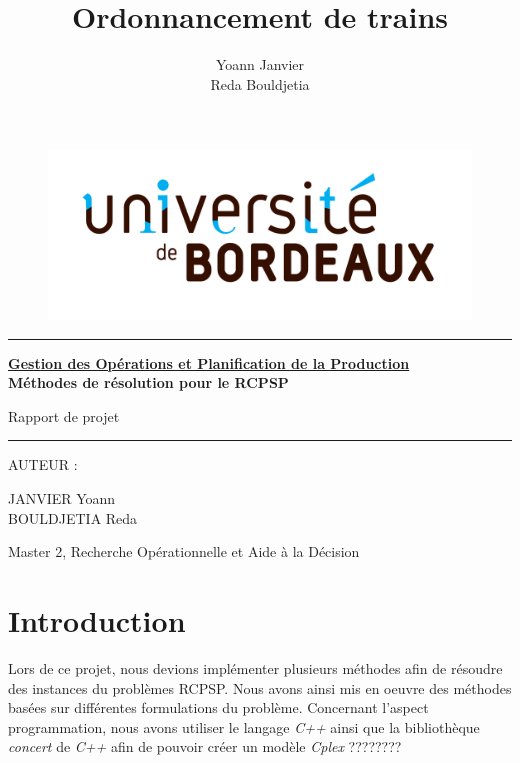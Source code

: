 \documentclass[french,a4paper,10pt]{article}
\title{Ordonnancement de trains}
\author{Yoann Janvier\\ Reda Bouldjetia}
\begin{document}
\begin{figure}
\begin{center}
    \includegraphics[width=0.30\linewidth, height=0.20\linewidth]{logo_UnivBdx.jpeg}
\end{center}
\end{figure}

\begin{center} \rule{\linewidth}{0.5pt}
\end{center}
\begin{huge} \textbf{\underline{Gestion des Opérations et Planification de la Production} \\Méthodes de résolution pour le RCPSP} \end{huge}
\begin{flushright} \begin{huge} Rapport de projet\end{huge} \end{flushright}

\begin{center} \rule{\linewidth}{0.5pt} \end{center}

\begin{flushleft} \large{AUTEUR : } \end{flushleft}

JANVIER Yoann\\
BOULDJETIA Reda


\vspace{300pt}

\begin{center} {Master 2, Recherche Opérationnelle et Aide à la Décision}\\
\end{center}
\newpage
\tableofcontents
\newpage

\section{Introduction}
Lors de ce projet, nous devions implémenter plusieurs méthodes afin de résoudre des instances du problèmes RCPSP. Nous avons ainsi mis en oeuvre des méthodes basées sur différentes formulations du problème. Concernant l'aspect programmation, nous avons utiliser le langage \textit{C++} ainsi que la bibliothèque \textit{concert} de \textit{C++} afin de pouvoir créer un modèle \textit{Cplex} ????????
\end{document}
